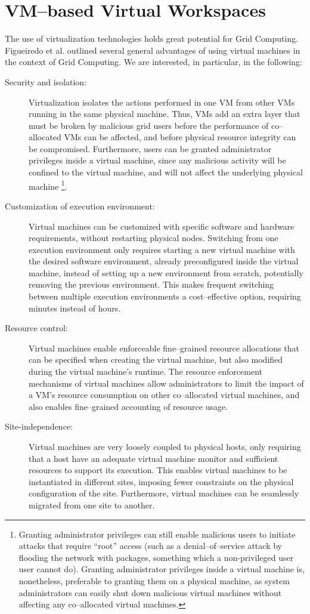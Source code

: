 \section{VM--based Virtual Workspaces}
\label{sec:vm}

The use of virtualization technologies \cite{vmbook} holds great potential for Grid Computing. Figueiredo et al.\cite{gridvm} outlined several general advantages of using virtual machines in the context of Grid Computing. We are interested, in particular, in the following:

\begin{description}
\item[Security and isolation:] Virtualization isolates the actions performed in one VM from other VMs running in the same physical machine. Thus, VMs add an extra layer that must be broken by malicious grid users before the performance of co--allocated VMs can be affected, and before physical resource integrity can be compromised. Furthermore, users can be granted administrator privileges inside a virtual machine, since any malicious activity will be confined to the virtual machine, and will not affect the underlying physical machine \footnote{Granting administrator privileges can still enable malicious users to initiate attacks that require ``root'' access (such as a denial--of--service attack by flooding the network with packages, something which a non-privileged user user cannot do). Granting administrator privileges inside a virtual machine is, nonetheless, preferable to granting them on a physical machine, as system administrators can easily shut down malicious virtual machines without affecting any co--allocated virtual machines.}.
\item[Customization of execution environment:] Virtual machines can be customized with specific software and hardware requirements, without restarting physical nodes. Switching from one execution environment only requires starting a new virtual machine with the desired software environment, already preconfigured inside the virtual machine, instead of setting up a new environment from scratch, potentially removing the previous environment. This makes frequent switching between multiple execution environments a cost--effective option, requiring minutes instead of hours.
\item[Resource control:] Virtual machines enable enforceable fine--grained resource allocations that can be specified when creating the virtual machine, but also modified during the virtual machine's runtime. The resource enforcement mechanisms of virtual machines allow administrators to limit the impact of a VM's resource consumption on other co--allocated virtual machines, and also enables fine--grained accounting of resource usage. 
\item[Site-independence:] Virtual machines are very loosely coupled to physical hosts, only requiring that a host have an adequate virtual machine monitor and sufficient resources to support its execution. This enables virtual machines to be instantiated in different sites, imposing fewer constraints on the physical configuration of the site. Furthermore, virtual machines can be seamlessly migrated from one site to another.
\end{description}

